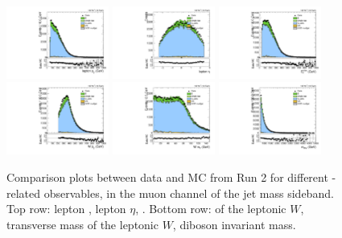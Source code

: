 \begin{figure}[htbp]
  \centering
  \includegraphics[width=0.3\textwidth]{fig/controlPlots/SB_b1_mu_allP_allC_allD_Run2_lnujj_l1_l_pt.pdf}
  \includegraphics[width=0.3\textwidth]{fig/controlPlots/SB_b1_mu_allP_allC_allD_Run2_lnujj_l1_l_eta.pdf}
  \includegraphics[width=0.3\textwidth]{fig/controlPlots/SB_b1_mu_allP_allC_allD_Run2_met_pt.pdf}\\
  \includegraphics[width=0.3\textwidth]{fig/controlPlots/SB_b1_mu_allP_allC_allD_Run2_lnujj_l1_pt.pdf}
  \includegraphics[width=0.3\textwidth]{fig/controlPlots/SB_b1_mu_allP_allC_allD_Run2_lnujj_l1_mt.pdf}
  \includegraphics[width=0.3\textwidth]{fig/controlPlots/SB_b1_mu_allP_allC_allD_Run2_mWV.pdf}
  \caption{
    Comparison plots between data and MC from Run 2 for different \Wlep-related observables, in the muon channel of the jet mass sideband.
    Top row: lepton \pt, lepton $\eta$, \ptmiss.
    Bottom row: \pt of the leptonic $W$, transverse mass of the leptonic $W$, diboson invariant mass.
  }
  \label{fig:SB_controlPlotsRun2_1}
\end{figure}

